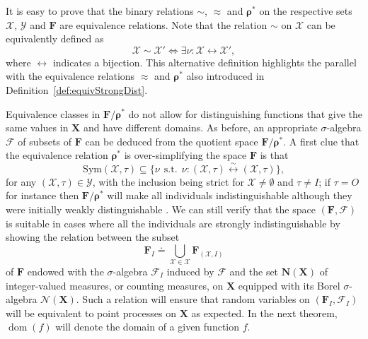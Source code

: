 \documentclass{aptpub}
\numberwithin{equation}{section}
\begin{document}
It is easy to prove that the binary relations $\sim$, ${\approx}$ and ${\boldsymbol{\rho}}^*$ on the respective sets ${\boldsymbol{\mathcal{X}}}$, ${\boldsymbol{\mathcal{Y}}}$ and ${\mathbf{F}}$ are equivalence relations. Note that the relation $\sim$ on ${\boldsymbol{\mathcal{X}}}$ can be equivalently defined as
{\begin{equation*}{
{\mathcal{X}} \sim {\mathcal{X}}' {\Leftrightarrow} \exists \nu: {\mathcal{X}} {\leftrightarrow} {\mathcal{X}}',
}\end{equation*}}
where ${\leftrightarrow}$ indicates a bijection. This alternative definition highlights the parallel with the equivalence relations ${\approx}$ and ${\boldsymbol{\rho}}^*$ also introduced in Definition~\ref{def:equivStrongDist}.

Equivalence classes in ${\mathbf{F}}/{\boldsymbol{\rho}}^*$ do not allow for distinguishing functions that give the same values in ${\mathbf{X}}$ and have different domains. As before, an appropriate $\sigma$-algebra ${\mathcal{F}}$ of subsets of ${\mathbf{F}}$ can be deduced from the quotient space ${\mathbf{F}}/{\boldsymbol{\rho}}^*$. A first clue that the equivalence relation ${\boldsymbol{\rho}}^*$ is over-simplifying the space ${\mathbf{F}}$ is that
{\begin{equation*}{
{\mathrm{Sym}}({\mathcal{X}},\tau) \subseteq \{ \nu {\;\,\mbox{s.t.}\;\,} \nu : ({\mathcal{X}},\tau) {\stackrel{\sim}{{\longleftrightarrow}}} ({\mathcal{X}},\tau) \},
}\end{equation*}}
for any $({\mathcal{X}},\tau) \in {\boldsymbol{\mathcal{Y}}}$, with the inclusion being strict for ${\mathcal{X}} \neq \emptyset$ and $\tau \neq I$; if $\tau = O$ for instance then ${\mathbf{F}}/{\boldsymbol{\rho}}^*$ will make all individuals indistinguishable although they were initially weakly distinguishable . 
We can still verify that the space $({\mathbf{F}},{\mathcal{F}})$ is suitable in cases where all the individuals are strongly indistinguishable by showing the relation between the subset
{\begin{equation*}{
{\mathbf{F}}_I {\doteq} \bigcup_{ {\mathcal{X}} \in {\boldsymbol{\mathcal{X}}} } {\mathbf{F}}_{({\mathcal{X}},I)}
}\end{equation*}}
of ${\mathbf{F}}$ endowed with the $\sigma$-algebra ${\mathcal{F}}_I$ induced by ${\mathcal{F}}$ and the set ${\mathbf{N}}({\mathbf{X}})$ of integer-valued measures, or counting measures, on ${\mathbf{X}}$ equipped with its Borel $\sigma$-algebra ${\mathcal{N}}({\mathbf{X}})$. Such a relation will ensure that random variables on $({\mathbf{F}}_I,{\mathcal{F}}_I)$ will be equivalent to point processes on ${\mathbf{X}}$ as expected. In the next theorem, $\operatorname{dom}(f)$ will denote the domain of a given function $f$.
\end{document}
